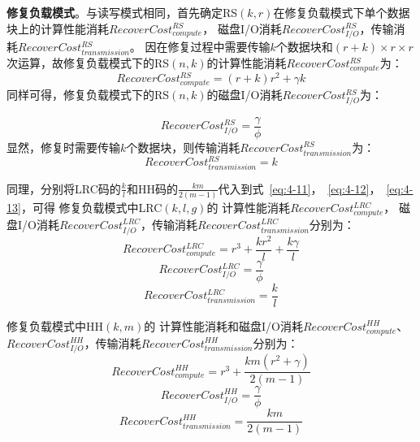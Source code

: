 \textbf{修复负载模式}。与读写模式相同，首先确定RS$(k,r)$在修复负载模式下单个数据块上的计算性能消耗$RecoverCost_{compute}^{RS}$，
磁盘I/O消耗$RecoverCost_{I/O}^{RS}$，传输消耗$RecoverCost_{transmission}^{RS}$。
因在修复过程中需要传输$k$个数据块和$(r+k)\times r \times r$\cite{qiu2020ec}次运算，故修复负载模式下的RS$(n,k)$的计算性能消耗$RecoverCost_{compute}^{RS}$为：
\begin{equation}
	\label{eq:4-11}
	RecoverCost_{compute}^{RS} = (r+k)r^2+\gamma k
\end{equation}
同样可得，修复负载模式下的RS$(n,k)$的磁盘I/O消耗$RecoverCost_{I/O}^{RS}$为：

\begin{equation}
	\label{eq:4-12}
	RecoverCost_{I/O}^{RS} = \frac{\gamma}{\phi}
\end{equation}
显然，修复时需要传输$k$个数据块，则传输消耗$RecoverCost_{transmission}^{RS}$为：
\begin{equation}
	\label{eq:4-13}
	RecoverCost_{transmission}^{RS} = k
\end{equation}

同理，分别将LRC码的$\frac{k}{l}$和HH码的$\frac{km}{2(m-1)}$代入到式~\ref{eq:4-11}，~\ref{eq:4-12}，~\ref{eq:4-13}，可得
修复负载模式中LRC$(k,l,g)$的
计算性能消耗$RecoverCost_{compute}^{LRC}$，
磁盘I/O消耗$RecoverCost_{I/O}^{LRC}$，传输消耗$RecoverCost_{transmission}^{LRC}$分别为：
\begin{equation}
	\label{eq:4-14}
	RecoverCost_{compute}^{LRC} = r^3 + \frac{kr^2}{l} + \frac{k\gamma}{l}
\end{equation}
\begin{equation}
	\label{eq:4-15}
	RecoverCost_{I/O}^{LRC} = \frac{\gamma}{\phi}
\end{equation}
\begin{equation}
	\label{eq:4-16}
	RecoverCost_{transmission}^{LRC} = \frac{k}{l}
\end{equation}

修复负载模式中HH$(k,m)$的
计算性能消耗和磁盘I/O消耗$RecoverCost_{compute}^{HH}$、
$RecoverCost_{I/O}^{HH}$，传输消耗$RecoverCost_{transmission}^{HH}$分别为：
\begin{equation}
	\label{eq:4-17}
	RecoverCost_{compute}^{HH} = r^3 + \frac{km(r^2+\gamma)}{2(m-1)}
\end{equation}
\begin{equation}
	\label{eq:4-18}
	RecoverCost_{I/O}^{HH} = \frac{\gamma}{\phi}
\end{equation}
\begin{equation}
	\label{eq:4-19}
	RecoverCost_{transmission}^{HH} = \frac{km}{2(m-1)}
\end{equation}

